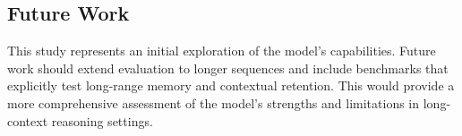 \subsection{Future Work}
This study represents an initial exploration of the model's capabilities. Future work should extend
evaluation to longer sequences and include benchmarks that explicitly test long-range memory and 
contextual retention. This would provide a more comprehensive assessment of the model's strengths 
and limitations in long-context reasoning settings.
\newpage